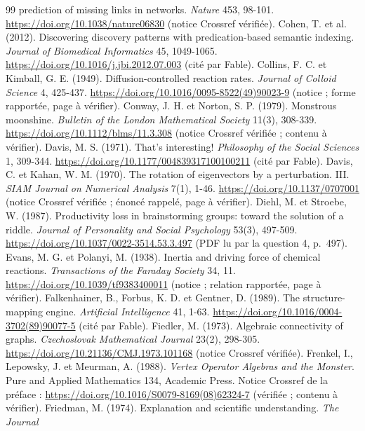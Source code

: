 \documentclass[11pt,a4paper]{article}
\theoremstyle{definition}
\theoremstyle{plain}
\begin{document}
\begin{thebibliography}{99}
prediction of missing links in networks. \emph{Nature} 453, 98-101.
\url{https://doi.org/10.1038/nature06830} (notice Crossref vérifiée).
 Cohen, T. et al. (2012). Discovering discovery patterns with predication-based
semantic indexing. \emph{Journal of Biomedical Informatics} 45, 1049-1065.
\url{https://doi.org/10.1016/j.jbi.2012.07.003} (cité par Fable).
 Collins, F. C. et Kimball, G. E. (1949). Diffusion-controlled reaction rates.
\emph{Journal of Colloid Science} 4, 425-437. \url{https://doi.org/10.1016/0095-8522(49)90023-9}
(notice ; forme rapportée, page à vérifier).
 Conway, J. H. et Norton, S. P. (1979). Monstrous moonshine. \emph{Bulletin of
the London Mathematical Society} 11(3), 308-339. \url{https://doi.org/10.1112/blms/11.3.308} (notice
Crossref vérifiée ; contenu à vérifier).
 Davis, M. S. (1971). That's interesting! \emph{Philosophy of the Social Sciences} 1,
309-344. \url{https://doi.org/10.1177/004839317100100211} (cité par Fable).
 Davis, C. et Kahan, W. M. (1970). The rotation of eigenvectors by a
perturbation. III. \emph{SIAM Journal on Numerical Analysis} 7(1), 1-46.
\url{https://doi.org/10.1137/0707001} (notice Crossref vérifiée ; énoncé rappelé, page à vérifier).
 Diehl, M. et Stroebe, W. (1987). Productivity loss in brainstorming groups:
toward the solution of a riddle. \emph{Journal of Personality and Social Psychology} 53(3), 497-509.
\url{https://doi.org/10.1037/0022-3514.53.3.497} (PDF lu par la question 4, p.~497).
 Evans, M. G. et Polanyi, M. (1938). Inertia and driving force of chemical
reactions. \emph{Transactions of the Faraday Society} 34, 11. \url{https://doi.org/10.1039/tf9383400011}
(notice ; relation rapportée, page à vérifier).
 Falkenhainer, B., Forbus, K. D. et Gentner, D. (1989). The structure-mapping
engine. \emph{Artificial Intelligence} 41, 1-63. \url{https://doi.org/10.1016/0004-3702(89)90077-5}
(cité par Fable).
 Fiedler, M. (1973). Algebraic connectivity of graphs. \emph{Czechoslovak
Mathematical Journal} 23(2), 298-305. \url{https://doi.org/10.21136/CMJ.1973.101168} (notice Crossref
vérifiée).
 Frenkel, I., Lepowsky, J. et Meurman, A. (1988). \emph{Vertex Operator Algebras and
the Monster}. Pure and Applied Mathematics 134, Academic Press. Notice Crossref de la préface :
\url{https://doi.org/10.1016/S0079-8169(08)62324-7} (vérifiée ; contenu à vérifier).
 Friedman, M. (1974). Explanation and scientific understanding. \emph{The Journal
}
\end{thebibliography}
\end{document}
